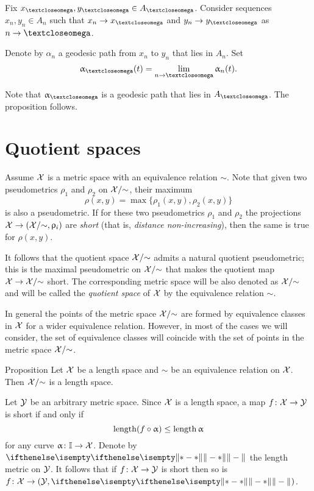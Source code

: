 Fix $x_\o,y_\o\in A_\o$.
Consider sequences $x_n,y_n\in A_n$ such that $x_n\to x_\o$ and $y_n\to y_\o$ as $n\to\o$.

Denote by $\alpha_n$ a geodesic path from $x_n$ to $y_n$ that lies in $A_n$.
Set
\[\alpha_\o(t)=\lim_{n\to \o}\alpha_n(t).\]

Note that $\alpha_\o$ is a geodesic path that lies in $A_\o$.
The proposition follows.
\qeds






\section{Quotient spaces}\label{sec:quotient}

 Assume $\mathcal{X}$ is a metric space
with an equivalence relation $\sim$.
Note that given two pseudometrics $\rho_1$ and $\rho_2$ on $\mathcal{X}/{\sim}$,
their maximum 
\[\rho(x,y)=\max\{\rho_1(x,y),\rho_2(x,y)\}\]
is also a pseudometric.
If for these two pseudometrics $\rho_1$ and $\rho_2$ the projections $\spc{X}\to(\spc{X}/{\sim},\rho_i)$ are \emph{short} (that is,  \emph{distance non-increasing}), then the same is true for $\rho(x,y)$.

It follows that 
the quotient space $\mathcal{X}/{\sim}$ admits a natural quotient pseudometric;
this is the maximal pseudometric on  $\mathcal{X}/{\sim}$ 
that makes the quotient map 
$\spc{X}\to\spc{X}/{\sim}$ short.
The corresponding metric space will be also denoted as $\mathcal{X}/{\sim}$
and will be called the \emph{quotient space} of $\mathcal{X}$ by the equivalence relation $\sim$.

In general  the points of the metric space $\mathcal{X}/{\sim}$
are formed by equivalence classes in $\mathcal{X}$
for a wider equivalence relation.
However, in  most of the cases we will consider, 
the set of equivalence classes will coincide with the set of points in the metric space $\mathcal{X}/{\sim}$.



\begin{thm}{Proposition}\label{prop:length-X}
Let $\mathcal{X}$ be a length space and 
$\sim$ be an equivalence relation on $\mathcal{X}$. Then $\mathcal{X}/{\sim}$
is a length space.
\end{thm}

Let $\mathcal{Y}$ be an arbitrary metric space.
Since $\mathcal{X}$ is a length space,
a map $f\:\spc{X}\to \spc{Y}$ is short if and only if 
\[\length(f\circ\alpha)\le \length\alpha\]
for any curve
$\alpha\:\II\to \spc{X}$.
Denote by $\yetdist{}{}{}$ the length metric on $\mathcal{Y}$.
It follows that if $f\:\spc{X}\to \spc{Y}$ is short
then so is 
$f\:\spc{X}\to (\spc{Y},\yetdist{}{}{})$.

